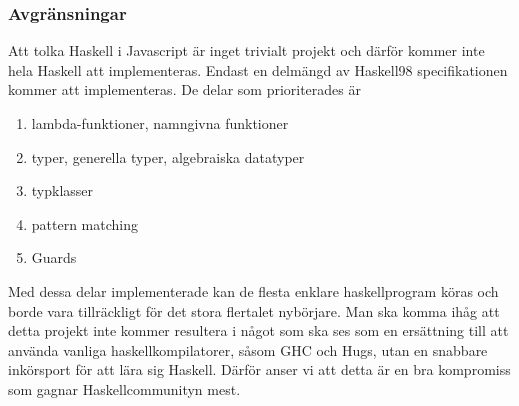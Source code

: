 \subsubsection{Avgränsningar}
Att tolka Haskell i Javascript är inget trivialt projekt och därför kommer inte hela Haskell att implementeras. 
Endast en delmängd av Haskell98 specifikationen kommer att implementeras. De delar som prioriterades är
        \begin{enumerate}
            \item{lambda-funktioner, namngivna funktioner}
            \item{typer, generella typer, algebraiska datatyper}
            \item{typklasser}
            \item{pattern matching}
            \item{Guards}
            \end{enumerate}
Med dessa delar implementerade kan de flesta enklare haskellprogram köras och borde vara tillräckligt för det stora flertalet nybörjare. Man ska komma ihåg att detta projekt inte kommer resultera i något som ska ses som en ersättning till att använda vanliga haskellkompilatorer, såsom GHC och Hugs, utan en snabbare inkörsport för att lära sig Haskell. Därför anser vi att detta är en bra kompromiss som gagnar Haskellcommunityn mest. %

